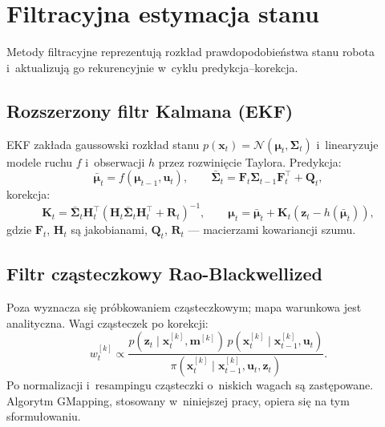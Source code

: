\section{Filtracyjna estymacja stanu}

Metody filtracyjne reprezentują rozkład prawdopodobieństwa stanu robota
i~aktualizują go rekurencyjnie w~cyklu predykcja--korekcja.

\subsection{Rozszerzony filtr Kalmana (EKF)}

EKF zakłada gaussowski rozkład stanu $p(\mathbf{x}_t) = \mathcal{N}(\boldsymbol{\mu}_t, \boldsymbol{\Sigma}_t)$
i~linearyzuje modele ruchu $f$ i~obserwacji $h$ przez rozwinięcie Taylora.
Predykcja:
\begin{equation}
    \bar{\boldsymbol{\mu}}_t = f(\boldsymbol{\mu}_{t-1}, \mathbf{u}_t), \qquad
    \bar{\boldsymbol{\Sigma}}_t = \mathbf{F}_t \boldsymbol{\Sigma}_{t-1} \mathbf{F}_t^\top + \mathbf{Q}_t,
\end{equation}
korekcja:
\begin{equation}
    \mathbf{K}_t = \bar{\boldsymbol{\Sigma}}_t \mathbf{H}_t^\top
    (\mathbf{H}_t \bar{\boldsymbol{\Sigma}}_t \mathbf{H}_t^\top + \mathbf{R}_t)^{-1}, \qquad
    \boldsymbol{\mu}_t = \bar{\boldsymbol{\mu}}_t + \mathbf{K}_t(\mathbf{z}_t - h(\bar{\boldsymbol{\mu}}_t)),
\end{equation}
gdzie $\mathbf{F}_t$, $\mathbf{H}_t$ są jakobianami, $\mathbf{Q}_t$, $\mathbf{R}_t$ ---
macierzami kowariancji szumu.

\subsection{Filtr cząsteczkowy Rao-Blackwellized}

Poza wyznacza się próbkowaniem cząsteczkowym; mapa warunkowa jest analityczna.
Wagi cząsteczek po korekcji:
\begin{equation}
    w_t^{[k]} \propto \frac{p(\mathbf{z}_t \mid \mathbf{x}_t^{[k]}, \mathbf{m}^{[k]}) \,
    p(\mathbf{x}_t^{[k]} \mid \mathbf{x}_{t-1}^{[k]}, \mathbf{u}_t)}
    {\pi(\mathbf{x}_t^{[k]} \mid \mathbf{x}_{t-1}^{[k]}, \mathbf{u}_t, \mathbf{z}_t)}.
\end{equation}
Po normalizacji i~resampingu cząsteczki o~niskich wagach są zastępowane.
Algorytm GMapping, stosowany w~niniejszej pracy, opiera się na tym sformułowaniu.

